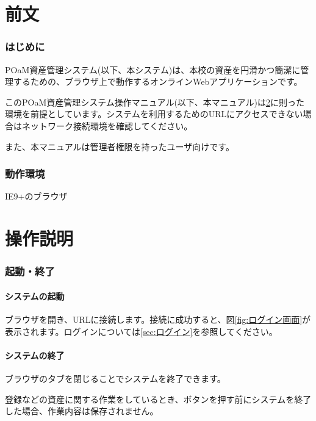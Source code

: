 \documentclass[11ptm]{jsarticle}
\begin{document}
\part{前文}
\hrulefill


\section{はじめに}
\label{sec:はじめに}
POaM資産管理システム(以下、本システム)は、本校の資産を円滑かつ簡潔に管理するための、ブラウザ上で動作するオンラインWebアプリケーションです。\par
このPOaM資産管理システム操作マニュアル(以下、本マニュアル)は\ref{sec:動作環境}に則った環境を前提としています。システムを利用するためのURLにアクセスできない場合はネットワーク接続環境を確認してください。\par
また、本マニュアルは管理者権限を持ったユーザ向けです。


\section{動作環境}
\label{sec:動作環境}
IE9+のブラウザ


\clearpage
\part{操作説明}
\hrulefill


\section{起動・終了}
\label{sec:起動・終了}

\subsection{システムの起動}
\label{sec:システムの起動}
ブラウザを開き、URLに接続します。接続に成功すると、図\ref{fig:ログイン画面}が表示されます。ログインについては\ref{sec:ログイン}を参照してください。

\subsection{システムの終了}
\label{sec:システムの終了}
ブラウザのタブを閉じることでシステムを終了できます。\par
登録などの資産に関する作業をしているとき、ボタンを押す前にシステムを終了した場合、作業内容は保存されません。
\end{document}

